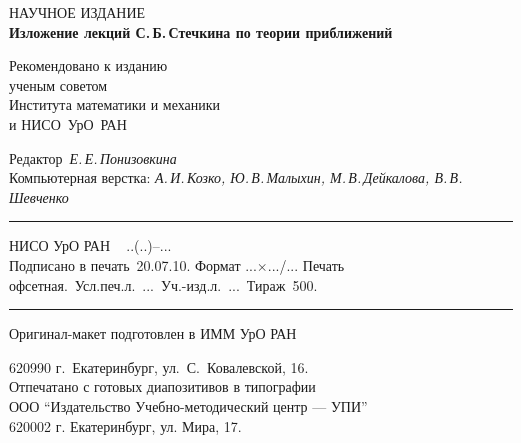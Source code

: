 \documentclass{report}
\begin{document}
 \newpage
\thispagestyle{empty}
\normalsize
\begin{center}
НАУЧНОЕ ИЗДАНИЕ\\[24pt]
{\large\textbf{Изложение лекций С.\,Б.\,Стечкина по теории приближений}}\\[4pt]


\vspace{28pt}

Рекомендовано к изданию\\
ученым советом\\
Института математики и механики\\
и НИСО\ УрО\ РАН
\end{center}

\vspace{5pt}

\begin{center}

    Редактор~{\em{Е.\,Е.\,Понизовкина}}\\[2ex]

 Компьютерная верстка: {\em{А.\,И.\,Козко, Ю.\,В.\,Малыхин,
М.\,В.\,Дейкалова, В.\,В.\,Шевченко}}\\[1ex]

\end{center}
\vfill

\hrule

\begin{center}  \footnotesize \noindent НИСО УрО РАН\,\ \textnumero~..(..)--...\\
Подписано в печать~20.07.10. Формат ...$\times$.../...\linebreak
Печать офсетная.\ Усл.печ.л.~...\ Уч.-изд.л.~...\
Тираж~500.\linebreak %
\hrule
\end{center}

\begin{center}
\footnotesize
 Оригинал-макет подготовлен в ИММ УрО РАН\\[2pt]
\end{center}

\begin{center}
\footnotesize
     620990 г.~Екатеринбург,
     ул.\ С.~Ковалевской, 16.\\ [2ex]

Отпечатано с готовых диапозитивов в типографии \\ ООО
``Издательство Учебно-методический центр --- УПИ''\\ 620002 г.
Екатеринбург, ул.  Мира, 17.

\end{center}
\end{document}
